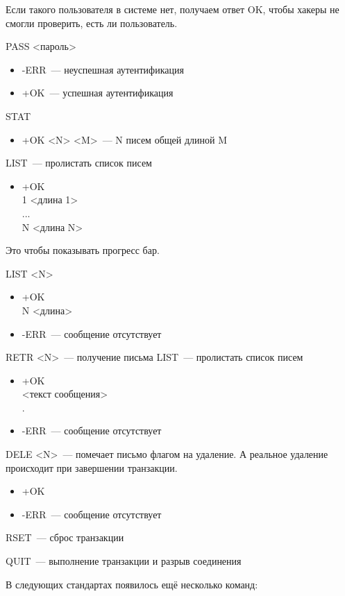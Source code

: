 Если такого пользователя в системе нет, получаем ответ OK, чтобы хакеры не смогли проверить, есть ли пользователь.

PASS <пароль>
\begin{itemize}
    \item -ERR~--- неуспешная аутентификация
    \item +OK~--- успешная аутентификация
\end{itemize}

STAT
\begin{itemize}
    \item +OK <N> <M>~--- N писем общей длиной M
\end{itemize}

LIST~--- пролистать список писем
\begin{itemize}
    \item +OK\\
    1 <длина 1>\\
    ...\\
    N <длина N>
\end{itemize}

Это чтобы показывать прогресс бар.


LIST <N>
\begin{itemize}
    \item +OK\\
    N <длина>
    \item -ERR~--- сообщение отсутствует
\end{itemize}

RETR <N>~--- получение письма
LIST~--- пролистать список писем
\begin{itemize}
    \item +OK\\
    <текст сообщения>\\
    .
    \item -ERR~--- сообщение отсутствует
\end{itemize}

DELE <N>~--- помечает письмо флагом на удаление. А реальное удаление происходит при завершении транзакции.
\begin{itemize}
    \item +OK
    \item -ERR~--- сообщение отсутствует
\end{itemize}

RSET~--- сброс транзакции

QUIT~--- выполнение транзакции и разрыв соединения

В следующих стандартах появилось ещё несколько команд:

